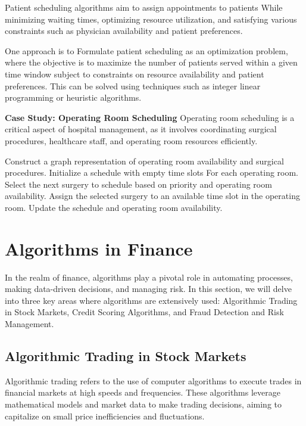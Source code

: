\documentclass[12pt]{book} %
\begin{document}
Patient scheduling algorithms aim to assign appointments to patients While minimizing waiting times, optimizing resource utilization, and satisfying various constraints such as physician availability and patient preferences.

One approach is to Formulate patient scheduling as an optimization problem, where the objective is to maximize the number of patients served within a given time window subject to constraints on resource availability and patient preferences. This can be solved using techniques such as integer linear programming or heuristic algorithms.

\textbf{Case Study: Operating Room Scheduling}
Operating room scheduling is a critical aspect of hospital management, as it involves coordinating surgical procedures, healthcare staff, and operating room resources efficiently.
\FloatBarrier
\begin{algorithm}
\caption{Operating Room Scheduling Algorithm}
\begin{algorithmic}[1]
\State Construct a graph representation of operating room availability and surgical procedures.
\State Initialize a schedule with empty time slots For each operating room.
    \State Select the next surgery to schedule based on priority and operating room availability.
    \State Assign the selected surgery to an available time slot in the operating room.
    \State Update the schedule and operating room availability.
\EndWhile
\end{algorithmic}
\end{algorithm}

\section{Algorithms in Finance}
In the realm of finance, algorithms play a pivotal role in automating processes, making data-driven decisions, and managing risk. In this section, we will delve into three key areas where algorithms are extensively used: Algorithmic Trading in Stock Markets, Credit Scoring Algorithms, and Fraud Detection and Risk Management.

\subsection{Algorithmic Trading in Stock Markets}
Algorithmic trading refers to the use of computer algorithms to execute trades in financial markets at high speeds and frequencies. These algorithms leverage mathematical models and market data to make trading decisions, aiming to capitalize on small price inefficiencies and fluctuations. 
\end{document}
